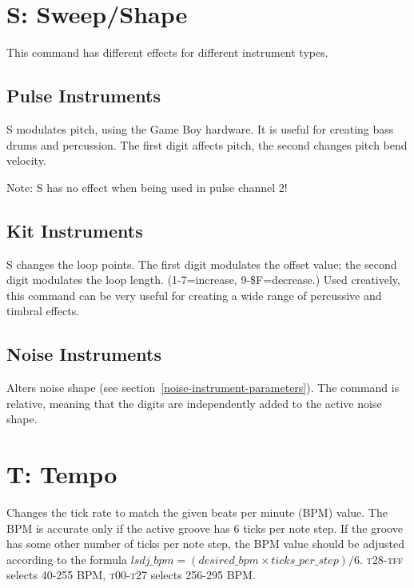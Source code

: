 \section{S: Sweep/Shape}

This command has different effects for different instrument types.

\subsection{Pulse Instruments}

S modulates pitch, using the Game Boy hardware. It is useful for creating bass drums and percussion. The first digit affects pitch, the second changes pitch bend velocity.

Note: S has no effect when being used in pulse channel 2!

\subsection{Kit Instruments}

S changes the loop points. The first digit modulates the offset value; the second digit modulates the loop length. (1-7=increase, 9-\$F=decrease.) Used creatively, this command can be very useful for creating a wide range of percussive and timbral effects.

\subsection{Noise Instruments}

Alters noise shape (see section~\ref{noise-instrument-parameters}).
The command is relative, meaning that the digits are independently added to the active noise shape.

\section{T: Tempo}

Changes the tick rate to match the given beats per minute (BPM) value. The BPM is accurate only if the active groove has 6 ticks per note step. If the groove has some other number of ticks per note step, the BPM value should be adjusted according to the formula
\begin{math}
lsdj\_bpm = (desired\_bpm \times ticks\_per\_step)/{6}
\end{math}.
\textsc{t28}-\textsc{tff} selects 40-255 BPM, \textsc{t00}-\textsc{t27} selects 256-295 BPM.

